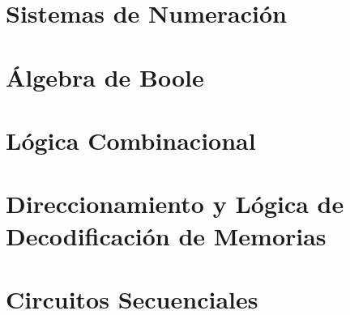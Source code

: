\documentclass{scrreprt}
\begin{document}
\newpage  
\section{Sistemas de Numeración}\label{sec:num}


\newpage
\section{Álgebra de Boole}\label{sec:bool}


\newpage
\section{Lógica Combinacional}\label{sec:logica}













\newpage
\section{Direccionamiento y Lógica de Decodificación de Memorias}\label{sec:mem}













\newpage
\section{Circuitos Secuenciales}\label{sec:sec}


\end{document}
